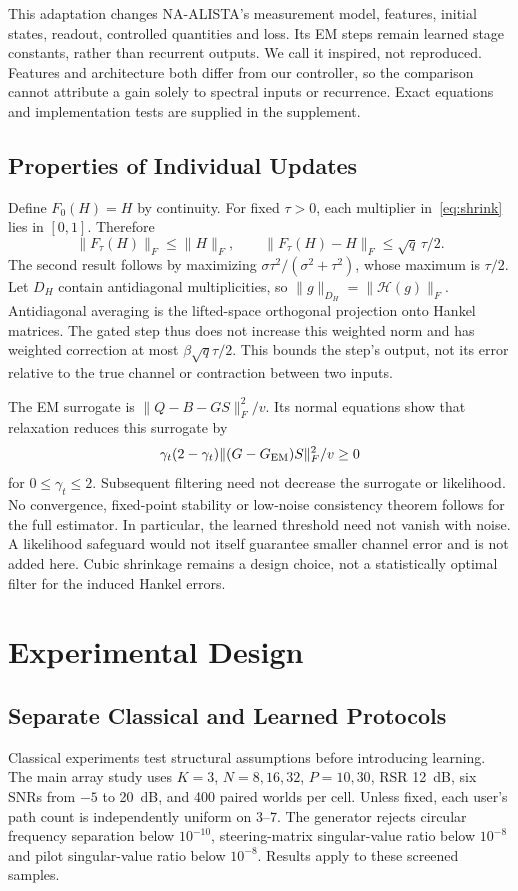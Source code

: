 \documentclass[10pt,journal,letterpaper]{IEEEtran}
\newcommand{\HH}{\mathcal{H}}
\begin{document}
This adaptation changes NA-ALISTA's measurement model, features, initial states, readout, controlled quantities and loss. Its EM steps remain learned stage constants, rather than recurrent outputs. We call it inspired, not reproduced. Features and architecture both differ from our controller, so the comparison cannot attribute a gain solely to spectral inputs or recurrence. Exact equations and implementation tests are supplied in the supplement.

\subsection{Properties of Individual Updates}
Define $F_0(H)=H$ by continuity. For fixed $\tau>0$, each multiplier in~\eqref{eq:shrink} lies in $[0,1]$. Therefore
\begin{equation}
 \|F_\tau(H)\|_F\le\|H\|_F,\qquad
 \|F_\tau(H)-H\|_F\le\sqrt q\,\tau/2.
 \label{eq:bound}
\end{equation}
The second result follows by maximizing $\sigma\tau^2/(\sigma^2+\tau^2)$, whose maximum is $\tau/2$. Let $D_H$ contain antidiagonal multiplicities, so $\|g\|_{D_H}=\|\HH(g)\|_F$. Antidiagonal averaging is the lifted-space orthogonal projection onto Hankel matrices. The gated step thus does not increase this weighted norm and has weighted correction at most $\beta\sqrt q\tau/2$. This bounds the step's output, not its error relative to the true channel or contraction between two inputs.

The EM surrogate is $\|Q-B-GS\|_F^2/v$. Its normal equations show that relaxation reduces this surrogate by
\begin{equation}
 \gamma_t(2-\gamma_t)\|(G-G_{\rm EM})S\|_F^2/v\ge0
\end{equation}
for $0\le\gamma_t\le2$. Subsequent filtering need not decrease the surrogate or likelihood. No convergence, fixed-point stability or low-noise consistency theorem follows for the full estimator. In particular, the learned threshold need not vanish with noise. A likelihood safeguard would not itself guarantee smaller channel error and is not added here. Cubic shrinkage remains a design choice, not a statistically optimal filter for the induced Hankel errors.

\section{Experimental Design}
\subsection{Separate Classical and Learned Protocols}
Classical experiments test structural assumptions before introducing learning. The main array study uses $K=3$, $N=8,16,32$, $P=10,30$, RSR 12~dB, six SNRs from $-5$ to 20~dB, and 400 paired worlds per cell. Unless fixed, each user's path count is independently uniform on 3--7. The generator rejects circular frequency separation below $10^{-10}$, steering-matrix singular-value ratio below $10^{-8}$ and pilot singular-value ratio below $10^{-8}$. Results apply to these screened samples.
\end{document}
